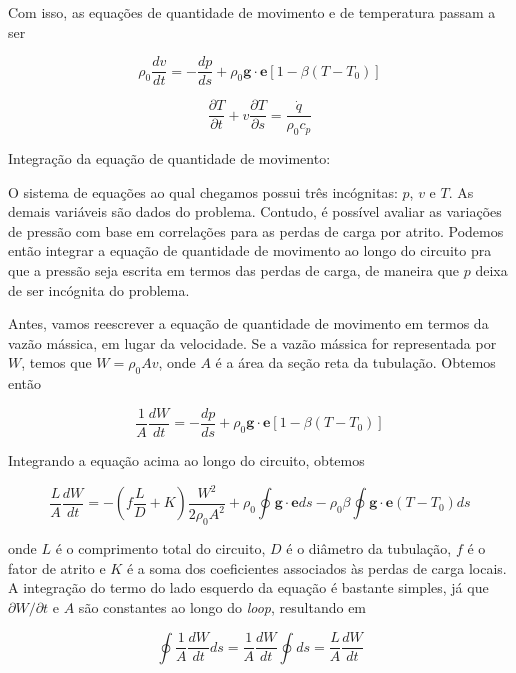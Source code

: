 \documentclass[a4paper,portuguese,10pt]{article}
\renewcommand{\D}{\partial}
\renewcommand{\vec}{\mathbf}
\begin{document}
Com isso, as equações de quantidade de movimento e de temperatura passam a ser

\begin{equation}
  \rho_0\frac{dv}{dt} = -\frac{dp}{ds} + \rho_0\vec{g}\cdot\vec{e}[1-\beta(T-T_0)]
\end{equation}

\begin{equation}
  \frac{\D T}{\D t}+v\frac{\D T}{\D s} = \frac{\dot{q}}{\rho_0c_p}
\end{equation}

Integração da equação de quantidade de movimento:

O sistema de equações ao qual chegamos possui três incógnitas: $p$, $v$ e $T$. As demais variáveis são dados do problema. Contudo, é possível avaliar as variações de pressão com base em correlações para as perdas de carga por atrito. Podemos então integrar a equação de quantidade de movimento ao longo do circuito pra que a pressão seja escrita em termos das perdas de carga, de maneira que $p$ deixa de ser incógnita do problema.

Antes, vamos reescrever a equação de quantidade de movimento em termos da vazão mássica, em lugar da velocidade. Se a vazão mássica for representada por $W$, temos que $W = \rho_0Av$, onde $A$ é a área da seção reta da tubulação. Obtemos então

\begin{equation}
  \frac{1}{A}\frac{dW}{dt} = -\frac{dp}{ds} + \rho_0\vec{g}\cdot\vec{e}[1-\beta(T-T_0)]
\end{equation}

Integrando a equação acima ao longo do circuito, obtemos

\begin{equation}
  \frac{L}{A}\frac{dW}{dt} = -\left(f\frac{L}{D}+K\right)\frac{W^2}{2\rho_0A^2} + \rho_0\oint\vec{g}\cdot\vec{e}ds - \rho_0\beta\oint\vec{g}\cdot\vec{e}(T-T_0)ds
\end{equation}

onde $L$ é o comprimento total do circuito, $D$ é o diâmetro da tubulação, $f$ é o fator de atrito e $K$ é a soma dos coeficientes associados às perdas de carga locais. A integração do termo do lado esquerdo da equação é bastante simples, já que $\D W/\D t$ e $A$ são constantes ao longo do {\it loop}, resultando em

\begin{equation}
  \oint\frac{1}{A}\frac{dW}{dt}ds = \frac{1}{A}\frac{dW}{dt}\oint ds = \frac{L}{A}\frac{dW}{dt}
\end{equation}
\end{document}
